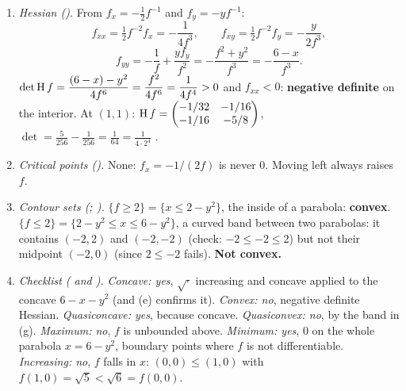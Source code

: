 \begin{solutions}
\begin{enumerate}[label=(\alph*),leftmargin=1.8em,itemsep=0.4ex]
                parabolas where the levels rise: steepest ascent, with slope
                $\sqrt5/4$ in that direction ().
          \item \emph{Hessian ().} From $f_{x}=-\tfrac12f^{-1}$
                and $f_{y}=-yf^{-1}$:
                \[
                  f_{xx}=\tfrac12f^{-2}f_{x}=-\frac{1}{4f^{3}},\qquad
                  f_{xy}=\tfrac12f^{-2}f_{y}=-\frac{y}{2f^{3}},
                \]
                \[
                  f_{yy}=-\frac1f+\frac{yf_{y}}{f^{2}}
                        =-\frac{f^{2}+y^{2}}{f^{3}}=-\frac{6-x}{f^{3}} .
                \]
                $\det\operatorname{H} f=\dfrac{(6-x)-y^{2}}{4f^{6}}
                =\dfrac{f^{2}}{4f^{6}}=\dfrac{1}{4f^{4}}>0$ and
                $f_{xx}<0$: \textbf{negative definite} on the interior. At
                $(1,1)$: $\operatorname{H} f=\begin{pmatrix}-1/32&-1/16\\-1/16&-5/8
                \end{pmatrix}$, $\det=\tfrac{5}{256}-\tfrac{1}{256}
                =\tfrac1{64}=\tfrac{1}{4\cdot2^{4}}$ \checkmark.
          \item \emph{Critical points ().} None:
                $f_{x}=-1/(2f)$ is never $0$. Moving left always raises $f$.
          \item \emph{Contour sets (; ).}
                $\{f\ge2\}=\{x\le2-y^{2}\}$, the inside of a parabola:
                \textbf{convex}. $\{f\le2\}=\{2-y^{2}\le x\le6-y^{2}\}$, a
                curved band between two parabolas: it contains $(-2,2)$ and
                $(-2,-2)$ (check: $-2\le-2\le2$) but not their midpoint
                $(-2,0)$ (since $2\le-2$ fails). \textbf{Not convex.}
          \item \emph{Checklist ( and ).}
                \emph{Concave: yes}, $\sqrt{\cdot}$ increasing and concave
                applied to the concave $6-x-y^{2}$ (and (e) confirms it).
                \emph{Convex: no}, negative definite Hessian.
                \emph{Quasiconcave: yes}, because concave.
                \emph{Quasiconvex: no}, by the band in (g).
                \emph{Maximum: no}, $f$ is unbounded above.
                \emph{Minimum: yes}, $0$ on the whole parabola $x=6-y^{2}$,
                boundary points where $f$ is not differentiable.
                \emph{Increasing: no}, $f$ falls in $x$: $(0,0)\le(1,0)$
                with $f(1,0)=\sqrt5<\sqrt6=f(0,0)$.

\end{enumerate}
\end{solutions}

